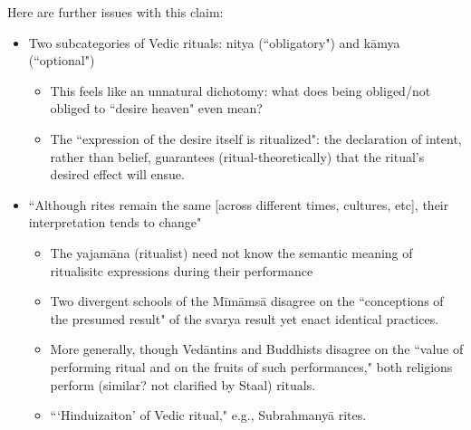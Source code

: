 \documentclass[12pt]{article}
\begin{document}
Here are further issues with this claim:
\begin{itemize}
  \item Two subcategories of Vedic rituals: nitya (``obligatory") and k\={a}mya (``optional")
    \begin{itemize}
      \item This feels like an unnatural dichotomy: 
        what does being obliged/not obliged to ``desire heaven" even mean? 
      \item The ``expression of the desire itself is ritualized": 
        the declaration of intent, rather than belief, guarantees (ritual-theoretically) that the ritual's desired effect will ensue. 
    \end{itemize}
  \item ``Although rites remain the same [across different times, cultures, etc], their interpretation tends to change" 
    \begin{itemize}
      \item The yajam\={a}na (ritualist) need not know the semantic meaning of ritualisitc expressions during their performance 
      \item Two divergent schools of the M\={i}m\={a}ms\={a} disagree on the ``conceptions of the presumed result" of the svarya result yet enact identical practices. 
      \item More generally, though Ved\={a}ntins and Buddhists disagree on the ``value of performing ritual and on the fruits of such performances," both religions perform (similar? not clarified by Staal) rituals.  
      \item ```Hinduizaiton' of Vedic ritual," e.g., Subrahmany\={a} rites. 
    \end{itemize}
\end{itemize}
\end{document}

